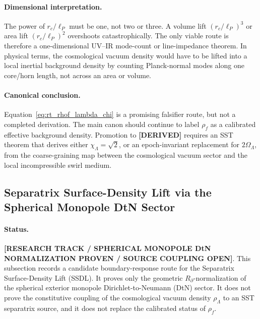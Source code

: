 \paragraph{Dimensional interpretation.}
The power of \(r_c/\ell_P\) must be one, not two or three. A volume lift
\((r_c/\ell_P)^3\) or area lift \((r_c/\ell_P)^2\) overshoots catastrophically.
The only viable route is therefore a one-dimensional UV--IR mode-count or
line-impedance theorem. In physical terms, the cosmological vacuum density
would have to be lifted into a local inertial background density by counting
Planck-normal modes along one core/horn length, not across an area or volume.

\paragraph{Canonical conclusion.}
Equation~\eqref{eq:rt_rhof_lambda_chi} is a promising falsifier route, but
not a completed derivation. The main canon should continue to label
\(\rho_{\!f}\) as a calibrated effective background density. Promotion to
\textbf{[DERIVED]} requires an SST theorem that derives either
\(\chi_\Lambda=\sqrt{2}\), or an epoch-invariant replacement for
\(2\Omega_\Lambda\), from the coarse-graining map between the cosmological
vacuum sector and the local incompressible swirl medium.

\subsection{Separatrix Surface-Density Lift via the Spherical Monopole DtN Sector}
\label{subsec:ssdl_monopole_dtn}

\paragraph{Status.}
\textbf{[RESEARCH TRACK / SPHERICAL MONOPOLE DtN NORMALIZATION PROVEN / SOURCE COUPLING OPEN]}.
This subsection records a candidate boundary-response route for the
Separatrix Surface-Density Lift (SSDL).  It proves only the geometric
\(R_\partial\)-normalization of the spherical exterior monopole
Dirichlet-to-Neumann (DtN) sector.  It does not prove the constitutive
coupling of the cosmological vacuum density \(\rho_\Lambda\) to an SST
separatrix source, and it does not replace the calibrated status of
\(\rho_{\!f}\).

